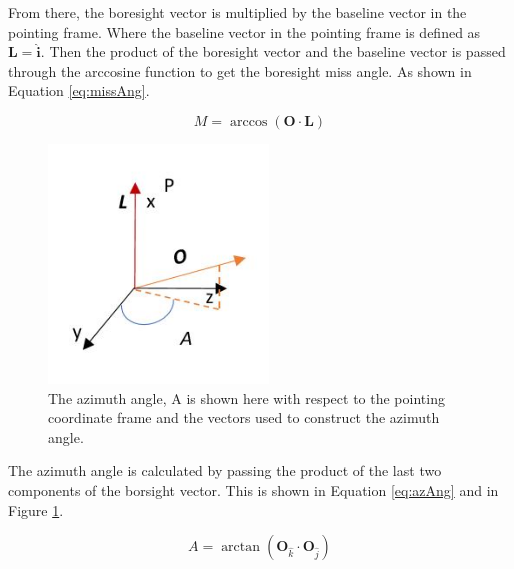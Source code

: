 From there, the boresight vector is multiplied by the baseline vector in the pointing frame. Where the baseline vector in the pointing frame is defined as $\bm L = \hat{\bm i}$. Then the product of the boresight vector and the baseline vector is passed through the arccosine function to get the boresight miss angle. As shown in Equation \ref{eq:missAng}.

 \begin{equation}
 	\label{eq:missAng}
 	M = \arccos(\bm O \cdot \bm L)
\end{equation}

\begin{figure}[H]
	\centerline{
		 \includegraphics[height = 2.5in]{Figures/azi.JPG}
	}
	\caption{The azimuth angle, A is shown here with respect to the pointing coordinate frame and the vectors used to construct the azimuth angle.}
	\label{fig:Fig2}
\end{figure}
 
The azimuth angle is calculated by passing the product of the last two components of the borsight vector. This is shown in Equation \ref{eq:azAng} and in Figure \ref{fig:Fig2}.

 \begin{equation}
 	\label{eq:azAng}
 	A = \arctan(\bm O_{\hat k} \cdot \bm O_{\hat j})
\end{equation}